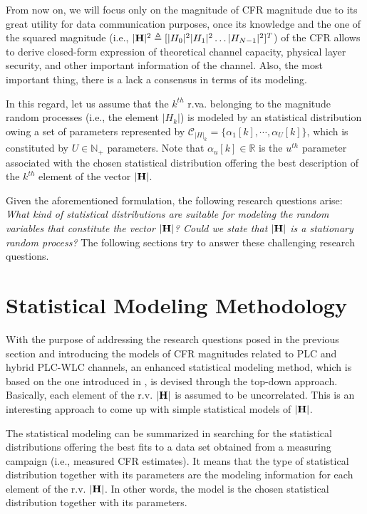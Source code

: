 \documentclass[journal]{IEEEtran}
\begin{document}
From now on, we will focus only on the magnitude of \ac{CFR} magnitude due to its great utility for data communication purposes, once its knowledge and the one of the squared magnitude (i.e.,  $|{\bf H}|^2\triangleq[|H_0|^2|H_1|^2\ldots |H_{N-1}|^2]^T$) of the \ac{CFR} allows to derive closed-form expression of theoretical channel capacity, physical layer security, and other important information of the channel. Also, the most important thing, there is a lack a consensus in terms of its modeling. 

In this regard, let us assume that the $k^{th}$ \ac{r.va.} belonging to the magnitude random processes (i.e., the element $|H_k|$) is modeled by an statistical distribution owing a set of parameters represented by $\mathcal{C}_{|H|_k} = \{ \alpha_{1}[k], \cdots, \alpha_{U}[k] \}$, which is constituted by $U \in \mathbb{N}_+$ parameters. Note that $\alpha_{u}[k] \in \mathbb{R}$ is the $u^{th}$ parameter associated with the chosen statistical distribution offering the best description of the $k^{th}$ element of the vector $|{\bf H}|$.

Given the aforementioned formulation, the following research questions arise: \textit{What kind of statistical distributions are suitable for modeling the random variables that constitute the vector $|{\bf H}|$? Could we state that $|{\bf H}|$ is a stationary random process?} The following sections try to answer these challenging research questions.

\section{Statistical Modeling Methodology}

With the purpose of addressing the research questions posed in the previous section and introducing the models of \ac{CFR} magnitudes related to \ac{PLC} and hybrid \ac{PLC}-\ac{WLC} channels, an enhanced statistical modeling method, which is based on the one introduced in \cite{Luis:AI}, is devised through the top-down approach. Basically, each element of the \ac{r.v.} ${\bf |H|}$ is assumed to be uncorrelated. This is an interesting approach to come up with simple statistical models of ${\bf |H|}$.

The statistical modeling can be summarized in searching for the statistical distributions offering the best fits to a data set obtained from a measuring campaign (i.e., measured \ac{CFR} estimates). It means that the type of statistical distribution together with its parameters are the modeling information for each element of the \ac{r.v.}  ${\bf |H|}$. In other words, the model is the chosen statistical distribution together with its parameters.
\end{document}
